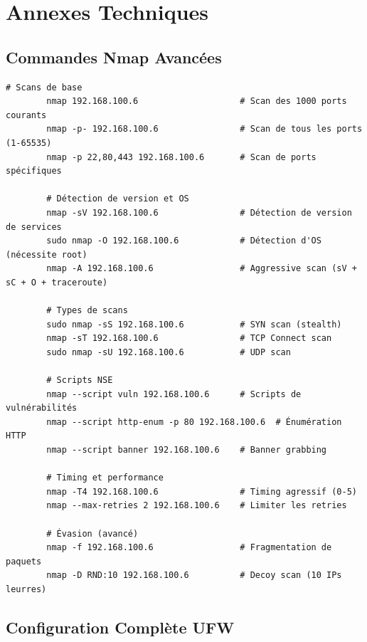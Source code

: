 \documentclass[12pt,a4paper,openany]{report}
\begin{document}
	\appendix
	\chapter{Annexes Techniques}
	
	\section{Commandes Nmap Avancées}
	
	\begin{lstlisting}[caption=Référence Rapide Nmap]
		# Scans de base
		nmap 192.168.100.6                    # Scan des 1000 ports courants
		nmap -p- 192.168.100.6                # Scan de tous les ports (1-65535)
		nmap -p 22,80,443 192.168.100.6       # Scan de ports spécifiques
		
		# Détection de version et OS
		nmap -sV 192.168.100.6                # Détection de version de services
		sudo nmap -O 192.168.100.6            # Détection d'OS (nécessite root)
		nmap -A 192.168.100.6                 # Aggressive scan (sV + sC + O + traceroute)
		
		# Types de scans
		sudo nmap -sS 192.168.100.6           # SYN scan (stealth)
		nmap -sT 192.168.100.6                # TCP Connect scan
		sudo nmap -sU 192.168.100.6           # UDP scan
		
		# Scripts NSE
		nmap --script vuln 192.168.100.6      # Scripts de vulnérabilités
		nmap --script http-enum -p 80 192.168.100.6  # Énumération HTTP
		nmap --script banner 192.168.100.6    # Banner grabbing
		
		# Timing et performance
		nmap -T4 192.168.100.6                # Timing agressif (0-5)
		nmap --max-retries 2 192.168.100.6    # Limiter les retries
		
		# Évasion (avancé)
		nmap -f 192.168.100.6                 # Fragmentation de paquets
		nmap -D RND:10 192.168.100.6          # Decoy scan (10 IPs leurres)
	\end{lstlisting}
	
	\section{Configuration Complète UFW}
	
\end{document}
